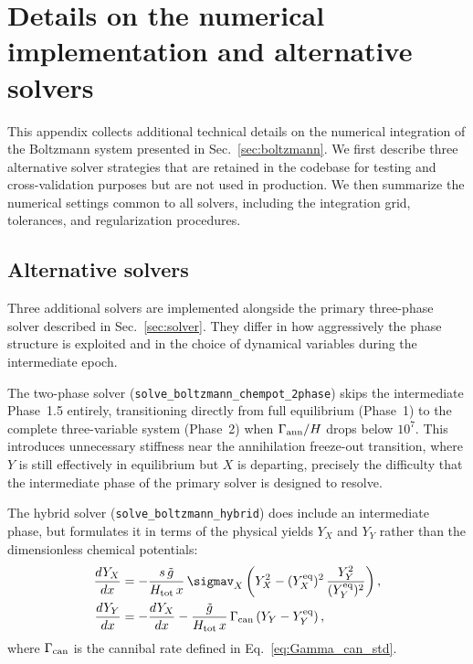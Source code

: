 \section{Details on the numerical implementation and alternative solvers}
\label{app:numerics}

This appendix collects additional technical details on the numerical integration of the Boltzmann system presented in Sec.~\ref{sec:boltzmann}. We first describe three alternative solver strategies that are retained in the codebase for testing and cross-validation purposes but are not used in production. We then summarize the numerical settings common to all solvers, including the integration grid, tolerances, and regularization procedures.

\subsection{Alternative solvers}
\label{app:legacy}

Three additional solvers are implemented alongside the primary three-phase solver described in Sec.~\ref{sec:solver}. They differ in how aggressively the phase structure is exploited and in the choice of dynamical variables during the intermediate epoch.

The two-phase solver (\texttt{solve\_boltzmann\_chempot\_2phase}) skips the intermediate Phase~1.5 entirely, transitioning directly from full equilibrium (Phase~1) to the complete three-variable system (Phase~2) when $\Gamma_{\rm ann}/H$ drops below $10^7$. This introduces unnecessary stiffness near the annihilation freeze-out transition, where $Y$ is still effectively in equilibrium but $X$ is departing, precisely the difficulty that the intermediate phase of the primary solver is designed to resolve.

The hybrid solver (\texttt{solve\_boltzmann\_hybrid}) does include an intermediate phase, but formulates it in terms of the physical yields $Y_X$ and $Y_Y$ rather than the dimensionless chemical potentials:
\begin{align}
\frac{dY_X}{dx} &= -\frac{s\,\tilde g}{H_{\rm tot}\,x}\,\sigmav_X\left(Y_X^2 - (Y_X^{\rm eq})^2\,\frac{Y_Y^2}{(Y_Y^{\rm eq})^2}\right), \label{eq:dYX_hybrid} \\
\frac{dY_Y}{dx} &= -\frac{dY_X}{dx} - \frac{\tilde g}{H_{\rm tot}\,x}\,\Gamma_{\rm can}\,(Y_Y - Y_Y^{\rm eq})\,,
\label{eq:dYY_hybrid}
\end{align}
where $\Gamma_{\rm can}$ is the cannibal rate defined in Eq.~\eqref{eq:Gamma_can_std}.

